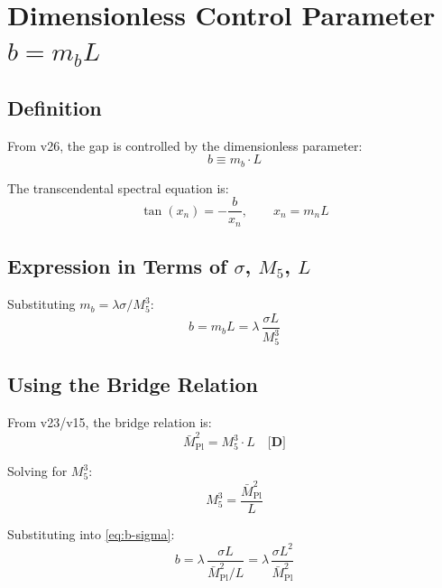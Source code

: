 \documentclass[11pt,a4paper]{article}
\newcommand{\Mpl}{\bar{M}_{\mathrm{Pl}}}
\newcommand{\Mfive}{M_5}
\newcommand{\mb}{m_b}
\newcommand{\tagD}{\textbf{[D]}}
\theoremstyle{definition}
\theoremstyle{plain}
\theoremstyle{remark}
\begin{document}
\section{Dimensionless Control Parameter $b = \mb L$}
\label{sec:dimensionless}

\subsection{Definition}

From v26, the gap is controlled by the dimensionless parameter:
\begin{equation}
b \equiv \mb \cdot L
\label{eq:b-def}
\end{equation}

The transcendental spectral equation is:
\begin{equation}
\tan(x_n) = -\frac{b}{x_n}, \qquad x_n = m_n L
\label{eq:spectral}
\end{equation}

\subsection{Expression in Terms of $\sigma$, $\Mfive$, $L$}

Substituting $\mb = \lambda\sigma/\Mfive^3$:
\begin{equation}
b = \mb L = \lambda \, \frac{\sigma L}{\Mfive^3}
\label{eq:b-sigma}
\end{equation}

\subsection{Using the Bridge Relation}

From v23/v15, the bridge relation is:
\begin{equation}
\Mpl^2 = \Mfive^3 \cdot L \quad \tagD{}
\label{eq:bridge}
\end{equation}

Solving for $\Mfive^3$:
\begin{equation}
\Mfive^3 = \frac{\Mpl^2}{L}
\label{eq:M5-from-bridge}
\end{equation}

Substituting into \cref{eq:b-sigma}:
\begin{equation}
b = \lambda \, \frac{\sigma L}{\Mpl^2/L} = \lambda \, \frac{\sigma L^2}{\Mpl^2}
\label{eq:b-Mpl}
\end{equation}
\end{document}
